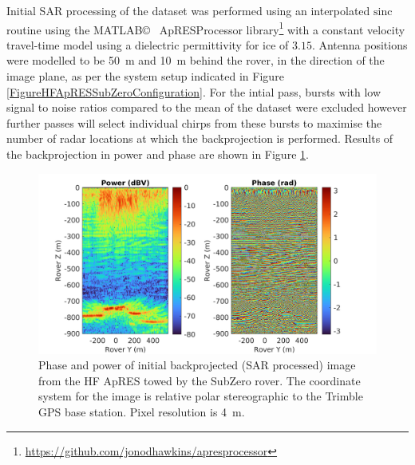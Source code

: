 \documentclass[a4paper,12pt]{article}
\begin{document}
Initial SAR processing of the dataset was performed using an interpolated 
$\textrm{sinc}$ routine using the MATLAB\copyright~ ApRESProcessor library\footnote{
\url{https://github.com/jonodhawkins/apresprocessor}} with a constant velocity
travel-time model using a dielectric permittivity for ice of $3.15$.  Antenna
positions were modelled to be \SI{50}{\metre} and \SI{10}{\metre} behind the
rover, in the direction of the image plane, as per the system setup indicated in
Figure \ref{FigureHFApRESSubZeroConfiguration}. For the
intial pass, bursts with low signal to noise ratios compared to the mean of the
dataset were excluded however further passes will select individual chirps from
these bursts to maximise the number of radar locations at which the
backprojection is performed.  Results of the backprojection in power and phase
are shown in Figure \ref{FigureHFApRESBackprojection}.

\begin{figure}[h]
  \centering 
  \includegraphics{../../Doc/ApRES/Rover/HF/StartStop/StartStopInitialInterp.png}
  \caption{Phase and power of initial backprojected (SAR processed) image from
  the HF ApRES towed by the SubZero rover.  The coordinate system for the image
  is relative polar stereographic to the Trimble GPS base station.  Pixel
  resolution is \SI{4}{\metre}.}
  \label{FigureHFApRESBackprojection}
\end{figure}
\end{document}
